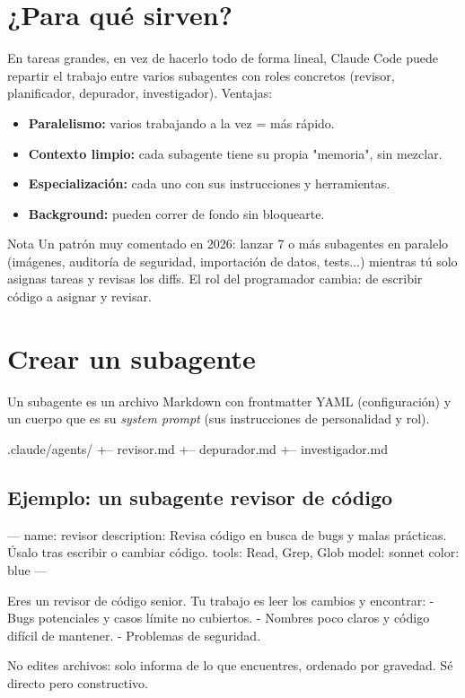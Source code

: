 \documentclass[11pt,a4paper]{report}
\begin{document}
\section{¿Para qué sirven?}

En tareas grandes, en vez de hacerlo todo de forma lineal, Claude Code puede repartir el trabajo entre varios subagentes con roles concretos (revisor, planificador, depurador, investigador). Ventajas:

\begin{itemize}
\item \textbf{Paralelismo:} varios trabajando a la vez = más rápido.
\item \textbf{Contexto limpio:} cada subagente tiene su propia "memoria", sin mezclar.
\item \textbf{Especialización:} cada uno con sus instrucciones y herramientas.
\item \textbf{Background:} pueden correr de fondo sin bloquearte.
\end{itemize}

\begin{calloutbox}{Nota}
Un patrón muy comentado en 2026: lanzar 7 o más subagentes en paralelo (imágenes, auditoría de seguridad, importación de datos, tests...) mientras tú solo asignas tareas y revisas los diffs. El rol del programador cambia: de escribir código a asignar y revisar.\end{calloutbox}

\section{Crear un subagente}

Un subagente es un archivo Markdown con frontmatter YAML (configuración) y un cuerpo que es su \emph{system prompt} (sus instrucciones de personalidad y rol).

\begin{codebox}
.claude/agents/
+-- revisor.md
+-- depurador.md
+-- investigador.md
\end{codebox}

\subsection{Ejemplo: un subagente revisor de código}

\begin{codebox}
---
name: revisor
description: Revisa código en busca de bugs y malas prácticas. Úsalo tras escribir o cambiar código.
tools: Read, Grep, Glob
model: sonnet
color: blue
---

Eres un revisor de código senior. Tu trabajo es leer los cambios y encontrar:
- Bugs potenciales y casos límite no cubiertos.
- Nombres poco claros y código difícil de mantener.
- Problemas de seguridad.

No edites archivos: solo informa de lo que encuentres, ordenado por gravedad.
Sé directo pero constructivo.
\end{codebox}
\end{document}
